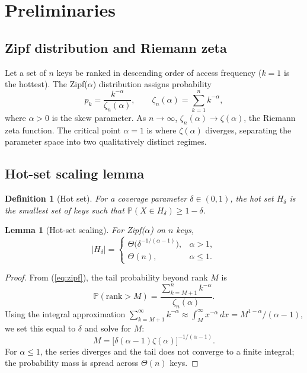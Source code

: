 \documentclass[preprint,12pt,authoryear]{elsarticle}
\newtheorem{lemma}[theorem]{Lemma}
\newtheorem{definition}[theorem]{Definition}
\newcommand{\Zeta}{\zeta}
\newcommand{\Prob}{\mathbb{P}}
\begin{document}
\section{Preliminaries}

\subsection{Zipf distribution and Riemann zeta}

Let a set of $n$ keys be ranked in descending order of access frequency
($k=1$ is the hottest).  The Zipf($\alpha$) distribution assigns
probability
\begin{equation}
p_k = \frac{k^{-\alpha}}{\Zeta_n(\alpha)},\qquad
\Zeta_n(\alpha) = \sum_{k=1}^n k^{-\alpha},
\label{eq:zipf}
\end{equation}
where $\alpha > 0$ is the skew parameter.  As $n \to \infty$,
$\Zeta_n(\alpha) \to \Zeta(\alpha)$, the Riemann zeta function.
The critical point $\alpha = 1$ is where $\Zeta(\alpha)$ diverges,
separating the parameter space into two qualitatively distinct regimes.

\subsection{Hot-set scaling lemma}

\begin{definition}[Hot set]
For a coverage parameter $\delta \in (0, 1)$, the \emph{hot set}
$H_\delta$ is the smallest set of keys such that
$\Prob(X \in H_\delta) \ge 1 - \delta$.
\end{definition}

\begin{lemma}[Hot-set scaling]
\label{lem:hot}
For Zipf($\alpha$) on $n$ keys,
\[
|H_\delta| =
\begin{cases}
\Theta\bigl(\delta^{-1/(\alpha-1)}\bigr), & \alpha > 1,\\[4pt]
\Theta(n), & \alpha \le 1.
\end{cases}
\]
\end{lemma}

\begin{proof}
From (\ref{eq:zipf}), the tail probability beyond rank $M$ is
\[
\Prob(\text{rank} > M) = \frac{\sum_{k=M+1}^n k^{-\alpha}}
{\Zeta_n(\alpha)}.
\]
Using the integral approximation $\sum_{k=M+1}^\infty k^{-\alpha}
\approx \int_M^\infty x^{-\alpha}\,dx = M^{1-\alpha}/(\alpha-1)$,
we set this equal to $\delta$ and solve for $M$:
\[
M = \bigl[\delta(\alpha-1)\Zeta(\alpha)\bigr]^{-1/(\alpha-1)}.
\]
For $\alpha \le 1$, the series diverges and the tail does not
converge to a finite integral; the probability mass is spread
across $\Theta(n)$ keys.
\end{proof}
\end{document}
